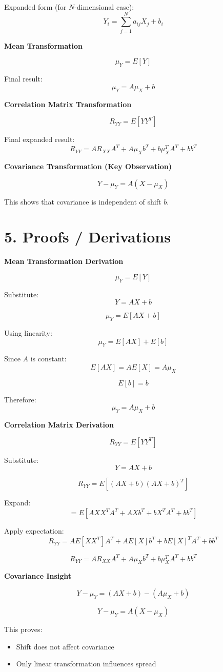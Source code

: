 \documentclass[12pt]{article}
\begin{document}
Expanded form (for $N$-dimensional case):
\[
Y_i = \sum_{j=1}^{N} a_{ij} X_j + b_i
\]

\textbf{Mean Transformation}

\[
\mu_Y = E[Y]
\]

Final result:
\[
\mu_Y = A\mu_X + b
\]

\textbf{Correlation Matrix Transformation}

\[
R_{YY} = E[YY^T]
\]

Final expanded result:
\[
R_{YY} = AR_{XX}A^T + A\mu_X b^T + b\mu_X^T A^T + bb^T
\]

\textbf{Covariance Transformation (Key Observation)}

\[
Y - \mu_Y = A(X - \mu_X)
\]

This shows that covariance is independent of shift $b$.

\section*{5. Proofs / Derivations}

\textbf{Mean Transformation Derivation}

\[
\mu_Y = E[Y]
\]

Substitute:
\[
Y = AX + b
\]

\[
\mu_Y = E[AX + b]
\]

Using linearity:
\[
\mu_Y = E[AX] + E[b]
\]

Since $A$ is constant:
\[
E[AX] = A E[X] = A\mu_X
\]

\[
E[b] = b
\]

Therefore:
\[
\mu_Y = A\mu_X + b
\]

\textbf{Correlation Matrix Derivation}

\[
R_{YY} = E[YY^T]
\]

Substitute:
\[
Y = AX + b
\]

\[
R_{YY} = E[(AX + b)(AX + b)^T]
\]

Expand:
\[
= E[AXX^T A^T + AXb^T + bX^T A^T + bb^T]
\]

Apply expectation:
\[
R_{YY} = AE[XX^T]A^T + AE[X]b^T + bE[X]^T A^T + bb^T
\]

\[
R_{YY} = AR_{XX}A^T + A\mu_X b^T + b\mu_X^T A^T + bb^T
\]

\textbf{Covariance Insight}

\[
Y - \mu_Y = (AX + b) - (A\mu_X + b)
\]

\[
Y - \mu_Y = A(X - \mu_X)
\]

This proves:
\begin{itemize}
\item Shift does not affect covariance
\item Only linear transformation influences spread
\end{itemize}
\end{document}

